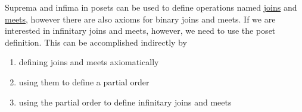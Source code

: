 \begin{note}\label{note:infinite_join_meet}
  Suprema and infima in posets can be used to define operations named \uline{joins} and \uline{meets}, however there are also axioms for binary joins and meets. If we are interested in infinitary joins and meets, however, we need to use the poset definition. This can be accomplished indirectly by
  \begin{enumerate}
    \item defining joins and meets axiomatically
    \item using them to define a partial order
    \item using the partial order to define infinitary joins and meets
  \end{enumerate}
\end{note}

